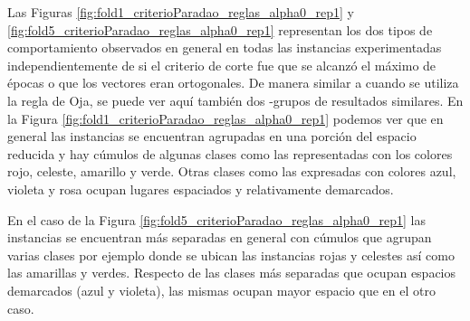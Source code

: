 \documentclass[informe.tex]{subfiles}
\begin{document}
      
      
      
      
	Las Figuras \ref{fig:fold1_criterioParadao_reglas_alpha0_rep1} y \ref{fig:fold5_criterioParadao_reglas_alpha0_rep1} representan los dos tipos de comportamiento observados en general en todas las instancias experimentadas independientemente de si el criterio de corte fue que se alcanzó el máximo de épocas o que los vectores eran ortogonales. De manera similar a cuando se utiliza la regla de Oja, se puede ver aquí también dos -grupos de resultados similares. En la Figura \ref{fig:fold1_criterioParadao_reglas_alpha0_rep1} podemos ver que en general las instancias se encuentran agrupadas en una porción del espacio reducida y hay cúmulos de algunas clases como las representadas con los colores rojo, celeste, amarillo y verde. Otras clases como las expresadas con colores azul, violeta y rosa ocupan lugares espaciados y relativamente demarcados.
	
	En el caso de la Figura \ref{fig:fold5_criterioParadao_reglas_alpha0_rep1} las instancias se encuentran más separadas en general con cúmulos que agrupan varias clases por ejemplo donde se ubican las instancias rojas y celestes así como las amarillas y verdes. Respecto de las clases más separadas que ocupan espacios demarcados (azul y violeta), las mismas ocupan mayor espacio que en el otro caso.
      
\end{document}
